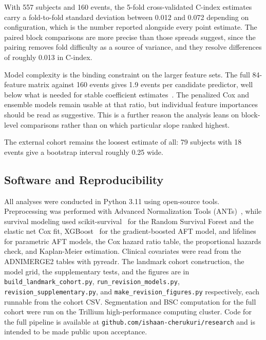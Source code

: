 \documentclass[blue]{ludusofficial}  %
\begin{document}
With 557 subjects and 160 events, the 5-fold cross-validated C-index estimates carry a fold-to-fold standard deviation between 0.012 and 0.072 depending on configuration, which is the number reported alongside every point estimate. The paired block comparisons are more precise than those spreads suggest, since the pairing removes fold difficulty as a source of variance, and they resolve differences of roughly 0.013 in C-index.

Model complexity is the binding constraint on the larger feature sets. The full 84-feature matrix against 160 events gives 1.9 events per candidate predictor, well below what is needed for stable coefficient estimates~\cite{riley2019minimum}. The penalized Cox and ensemble models remain usable at that ratio, but individual feature importances should be read as suggestive. This is a further reason the analysis leans on block-level comparisons rather than on which particular slope ranked highest.

The external cohort remains the loosest estimate of all: 79 subjects with 18 events give a bootstrap interval roughly 0.25 wide.

\subsection{Software and Reproducibility}

All analyses were conducted in Python 3.11 using open-source tools. Preprocessing was performed with Advanced Normalization Tools (ANTs)~\cite{avants2011ants}, while survival modeling used scikit-survival~\cite{polsterl2020sksurv} for the Random Survival Forest and the elastic net Cox fit, XGBoost~\cite{chen2016xgboost} for the gradient-boosted AFT model, and lifelines~\cite{davidson-pilon2019lifelines} for parametric AFT models, the Cox hazard ratio table, the proportional hazards check, and Kaplan-Meier estimation. Clinical covariates were read from the ADNIMERGE2 tables with pyreadr. The landmark cohort construction, the model grid, the supplementary tests, and the figures are in \texttt{build\_landmark\_cohort.py}, \texttt{run\_revision\_models.py}, \texttt{revision\_supplementary.py}, and \texttt{make\_revision\_figures.py} respectively, each runnable from the cohort CSV. Segmentation and BSC computation for the full cohort were run on the Trillium high-performance computing cluster. Code for the full pipeline is available at \texttt{github.com/ishaan-cherukuri/research} and is intended to be made public upon acceptance.
\end{document}

